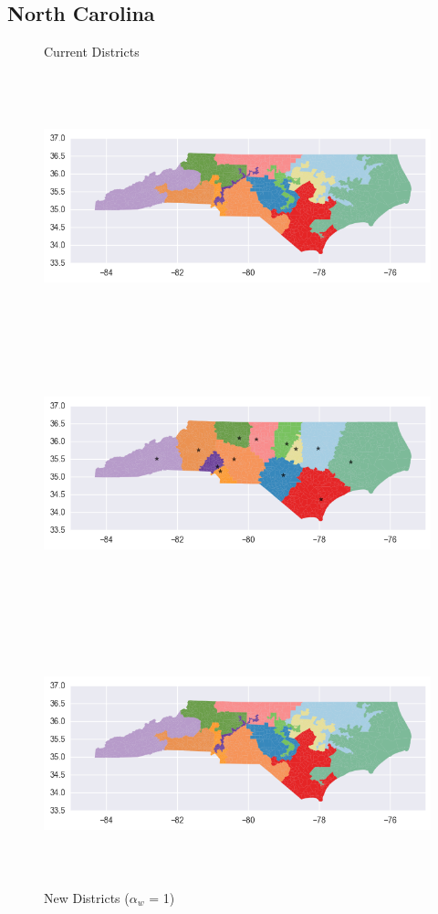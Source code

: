 \clearpage
\newpage

\subsection{North Carolina}
\begin{figure}[htb!] \centering
\caption{ Current Districts }
\includegraphics[width=5in,height=3in,keepaspectratio]{../maps/NC/static/before.png}
\includegraphics[width=5in,height=3in,keepaspectratio]{../maps/NC/static/0_0_after.png}
\caption{ New Districts ($\alpha_w$ = 1) }
\includegraphics[width=5in,height=3in,keepaspectratio]{../maps/NC/static/before.png}

\end{figure}

